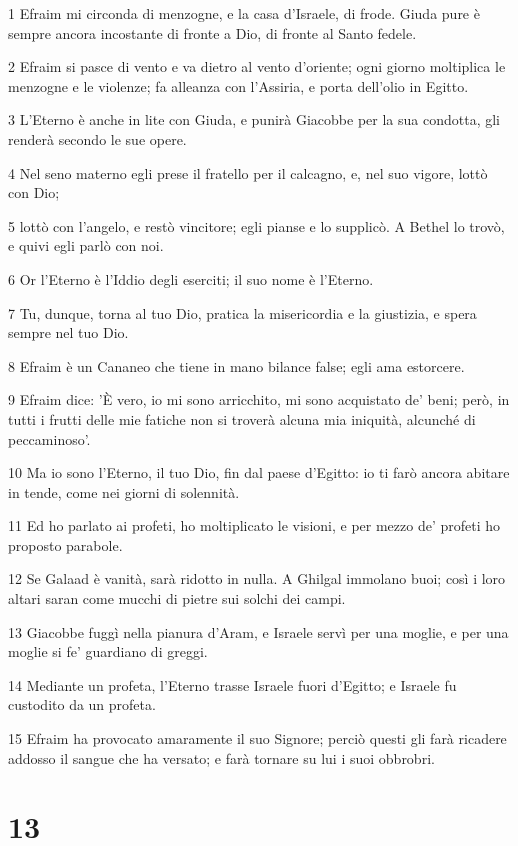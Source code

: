 \par 1 Efraim mi circonda di menzogne, e la casa d'Israele, di frode. Giuda pure è sempre ancora incostante di fronte a Dio, di fronte al Santo fedele.
\par 2 Efraim si pasce di vento e va dietro al vento d'oriente; ogni giorno moltiplica le menzogne e le violenze; fa alleanza con l'Assiria, e porta dell'olio in Egitto.
\par 3 L'Eterno è anche in lite con Giuda, e punirà Giacobbe per la sua condotta, gli renderà secondo le sue opere.
\par 4 Nel seno materno egli prese il fratello per il calcagno, e, nel suo vigore, lottò con Dio;
\par 5 lottò con l'angelo, e restò vincitore; egli pianse e lo supplicò. A Bethel lo trovò, e quivi egli parlò con noi.
\par 6 Or l'Eterno è l'Iddio degli eserciti; il suo nome è l'Eterno.
\par 7 Tu, dunque, torna al tuo Dio, pratica la misericordia e la giustizia, e spera sempre nel tuo Dio.
\par 8 Efraim è un Cananeo che tiene in mano bilance false; egli ama estorcere.
\par 9 Efraim dice: 'È vero, io mi sono arricchito, mi sono acquistato de' beni; però, in tutti i frutti delle mie fatiche non si troverà alcuna mia iniquità, alcunché di peccaminoso'.
\par 10 Ma io sono l'Eterno, il tuo Dio, fin dal paese d'Egitto: io ti farò ancora abitare in tende, come nei giorni di solennità.
\par 11 Ed ho parlato ai profeti, ho moltiplicato le visioni, e per mezzo de' profeti ho proposto parabole.
\par 12 Se Galaad è vanità, sarà ridotto in nulla. A Ghilgal immolano buoi; così i loro altari saran come mucchi di pietre sui solchi dei campi.
\par 13 Giacobbe fuggì nella pianura d'Aram, e Israele servì per una moglie, e per una moglie si fe' guardiano di greggi.
\par 14 Mediante un profeta, l'Eterno trasse Israele fuori d'Egitto; e Israele fu custodito da un profeta.
\par 15 Efraim ha provocato amaramente il suo Signore; perciò questi gli farà ricadere addosso il sangue che ha versato; e farà tornare su lui i suoi obbrobri.

\chapter{13}


